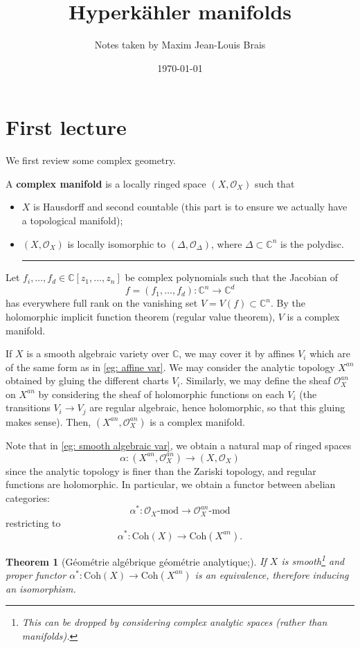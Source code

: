 \documentclass[11pt]{amsart}
\title{Hyperkähler manifolds}
\author{Notes taken by Maxim Jean-Louis Brais}
\date{\today}
\newcommand{\cO}{\mathcal{O}}
\newcommand{\tbf}[1]{\textbf{#1}}
\newcommand{\C}{\mathbb C}
\newif\ifqedbarused
\newcommand{\qedbar}{%
  \unskip\nobreak\hfill %
  \hspace{1em} %
  \rule{3em}{0.4pt} %
}
\newcommand{\qedbarhere}{%
  \qedbar%
  \global\qedbarusedtrue%
}
\newtheorem{theorem}{Theorem}[subsection]
\theoremstyle{definition}
\numberwithin{equation}{section}
\begin{document}
\maketitle
\section{First lecture}
We first review some complex geometry.
\begin{definition}
	A \tbf{complex manifold} is a locally ringed space $(X,\cO_X)$ such that
	\begin{itemize}
		\item $X$ is Hausdorff and second countable (this part is to ensure we actually have a topological manifold);
		\item $(X,\cO_X)$ is locally isomorphic to $(\Delta,\cO_\Delta)$, where $\Delta\subset \C^n$ is the polydisc.\qedbarhere 
	\end{itemize} 
\end{definition}
\begin{example}\label{eg: affine var}
	Let $f_i,\dots,f_d\in\C[z_1,\dots,z_n]$ be complex polynomials such that the Jacobian of
	\[f=(f_1,\dots,f_d):\C^n\to \C^d
	\]
	has everywhere full rank on the vanishing set $V=V(f)\subset \C^n$. By the holomorphic implicit function theorem (regular value theorem), $V$ is a complex manifold.
\end{example}
\begin{example}\label{eg: smooth algebraic var}
	If $X$ is a smooth algebraic variety over $\C$, we may cover it by affines $V_i$ which are of the same form as in \autoref{eg: affine var}. We may consider the analytic topology $X^{an}$ obtained by gluing the different charts $V_i$. Similarly, we may define the sheaf $\cO_X^{an}$ on $X^{an}$ by considering the sheaf of holomorphic functions on each $V_i$ (the transitions $V_i\to V_j$ are regular algebraic, hence holomorphic, so that this gluing makes sense). Then, $(X^{an},\cO_X^{an})$ is a complex manifold.
\end{example}

Note that in \autoref{eg: smooth algebraic var}, we obtain a natural map of ringed spaces
%
\[
\alpha:(X^{an},\cO_X^{an})\to (X,\cO_X)
\]
since the analytic topology is finer than the Zariski topology, and regular functions are holomorphic. In particular, we obtain a functor between abelian categories:
\[
\alpha^*:\cO_X\text{-mod}\to \cO_X^{an}\text{-mod}
\]
restricting to
\[
\alpha^*:\text{Coh}(X)\to \text{Coh}(X^{an}).
\]
\begin{theorem}[Géométrie algébrique géométrie analytique;\;\cite{Serre1956}]
If $X$ is smooth\footnote{This can be dropped by considering complex analytic spaces (rather than manifolds).} and proper functor $\alpha^*:\text{Coh}(X)\to\text{Coh}(X^{an})$ is an equivalence, therefore inducing an isomorphism.
\end{theorem}
\end{document}
